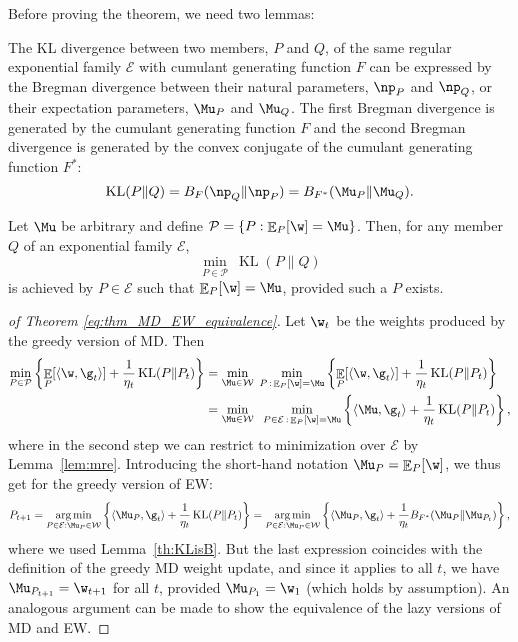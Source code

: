 \documentclass{colt2018} %
\DeclareMathOperator*{\E}{\mathbb{E}}
\DeclareMathOperator{\kl}{KL}
\DeclareMathOperator*{\argmin}{arg\,min}
\newcommand{\domainP}{\mathcal{P}}
\newcommand{\domainw}{\mathcal{W}}
\newcommand{\Expfam}{\mathcal{E}}		%
\newcommand{\inner}[2]{\langle #1, #2 \rangle}  %
\begin{document}
Before proving the theorem, we need two lemmas: 
% 
% 
% 
\begin{lemma}\label{th:KLisB}
The KL divergence between two members, $P$ and $Q$, of the same regular
exponential family $\Expfam$ with cumulant generating function $F$ can
be expressed by the Bregman divergence between their natural parameters,
$\np_P$ and $\np_Q$, or their expectation parameters, $\Mu_P$ and
$\Mu_Q$. The first Bregman divergence is generated by the cumulant
generating function $F$ and the second Bregman divergence is generated
by the convex conjugate of the cumulant generating function $F^*$:
\[
\kl(P\|Q) = B_F(\np_Q\|\np_P) = B_{F^*}(\Mu_P\|\Mu_Q).
\]
\end{lemma}

\begin{lemma}\label{lem:mre}\citep[Theorem 3.1.4]{ihara1993information}
Let $\Mu$ be arbitrary and define $\domainP =\{P:\E_P[\w] = \Mu\}$.
Then, for any member $Q$ of an exponential family $\Expfam$,
\[
\underset{P \in \domainP}{\min}~\kl(P\|Q)
\]
is achieved by $P \in \Expfam$ such that $\E_{P}[\w] = \Mu$, provided such a $P$ exists.
\end{lemma}

\begin{proof}[of Theorem \ref{eq:thm_MD_EW_equivalence}]
% 
% 
% 
% 
% 
% 
% 
% 
% 
% 
Let $\w_t$ be the weights produced by the greedy version of MD\@. Then
\begin{align*}
  \min_{P \in \domainP} \left\{\E_P[\inner{\w}{\g_t}] + \frac{1}{\eta_t} \kl(P\|P_t)\right\} 
  &= \min_{\Mu \in \domainw} \; \min_{P \,:\, \E_P[\w]=\Mu} \left\{\E_P[\inner{\w}{\g_t}] + \frac{1}{\eta_t} \kl(P\|P_t)\right\} \\
  &= \min_{\Mu \in \domainw} \;\;\min_{P \in \Expfam \,:\, \E_P[\w]=\Mu} \left\{ \inner{\Mu}{\g_t} + \frac{1}{\eta_t}
\kl(P\|P_t) \right\}, 
\end{align*}
% 
where in the second step we can restrict to minimization over $\Expfam$ by
Lemma~\ref{lem:mre}. Introducing the short-hand notation $\Mu_P =
\E_{P}[\w]$, we thus get for the greedy version of EW:
\[
  P_{t+1} = \argmin_{P \in \Expfam : \Mu_P \in \domainw}
  \left\{ \inner{\Mu_P}{\g_t} + \frac{1}{\eta_t}
\kl(P\|P_t) \right\} = 
\argmin_{P \in \Expfam : \Mu_P \in \domainw}
\left\{ \inner{\Mu_P}{\g_t} + \frac{1}{\eta_t} B_{F^*}(\Mu_P\| \Mu_{P_t}) \right\},
\]
where we used Lemma~\ref{th:KLisB}.
But the last expression coincides with the definition of the greedy MD weight update, and
since it applies to all $t$, we have $\Mu_{P_{t+1}} = \w_{t+1}$ for all $t$, provided
$\Mu_{P_1} = \w_1$ (which holds by assumption).
An analogous argument can be made to show the equivalence of the lazy
versions of MD and EW.
% 
% 
% 
% 
% 
% 
% 
% 
% 
% 
% 
% 
% 
% 
% 
% 
% 
% 
% 
% 
% 
% 
% 
% 
% 
% 
% 
% 
% 
% 
% 
% 
% 
% 
% 
% 
% 
% 
% 
% 
% 
% 
% 
% 
% 
\end{proof}
\end{document}
